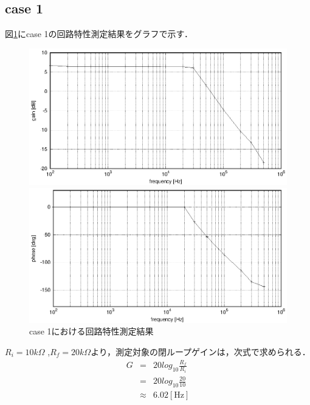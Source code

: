 \documentclass[dvipdfmx,titlepage,a4j]{jsarticle}  %
\begin{document}
\subsection{case 1}
図\ref{fig:gr:case1}にcase 1の回路特性測定結果をグラフで示す．
\begin{figure}[H]
  \centering
  \begin{minipage}{8cm}
    \centering
    \includegraphics[keepaspectratio, scale=0.6]{../data/case1-g.eps}
  \end{minipage}
  \begin{minipage}{8cm}
    \centering
    \includegraphics[keepaspectratio, scale=0.6]{../data/case1-f.eps}
  \end{minipage}
  \caption{case 1における回路特性測定結果}
  \label{fig:gr:case1}
\end{figure}

$R_i = 10k\Omega$ ,$R_f = 20k\Omega$より，測定対象の閉ループゲインは，次式で求められる．
\begin{eqnarray}
  G &=& 20 log_{10} \frac{R_f}{R_i}\\
  &=& 20 log_{10} \frac{20}{10}\\
  &\approx& 6.02 \mathrm{[Hz]}
\end{eqnarray}
\end{document}
